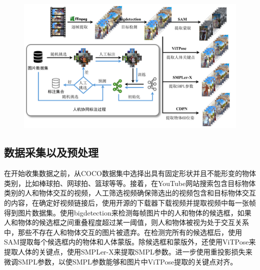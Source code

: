 \begin{figure}[!htbp]
	\centering
	\includegraphics{Img/annotation_pipeline}
	\label{fig:annotation_pipeline}
\end{figure}

\label{sec:dataset}
\subsection{数据采集以及预处理}
在开始收集数据之前，从COCO数据集中选择出具有固定形状并且不能形变的物体类别，比如棒球拍、网球拍、篮球等等。接着，在YouTube网站搜索包含目标物体类别的人和物体交互的视频，人工筛选视频确保筛选出的视频包含和目标物体交互的内容，在确定好视频链接后，使用开源的下载器下载视频并提取视频中每一张帧得到图片数据集。使用bigdetection\citep{Cai_2022_CVPR}来检测每帧图片中的人和物体的候选框，如果人和物体的候选框之间重叠程度超过某一阈值，则人和物体被视为处于交互关系中，那些不存在人和物体交互的图片被遗弃。在检测完所有的候选框后，使用SAM\citep{Kirillov_2023_ICCV}提取每个候选框内的物体和人体蒙版。除候选框和蒙版外，还使用ViTPose\citep{NEURIPS2022_fbb10d31}来提取人体的关键点，使用SMPLer-X\citep{NEURIPS2023_2614947a}来提取SMPL参数。进一步使用重投影损失来微调SMPL参数，以使SMPL参数能够和图片中ViTPose提取的关键点对齐。

